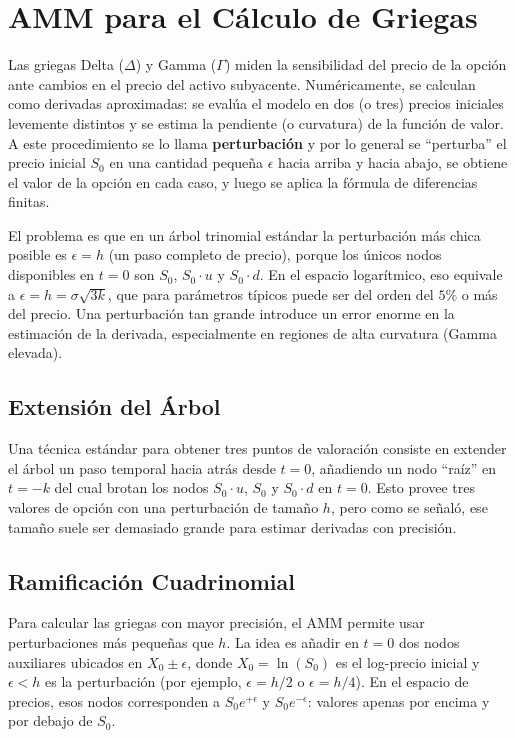 \section{AMM para el Cálculo de Griegas}
\label{sec:amm_greek}

Las griegas Delta ($\Delta$) y Gamma ($\Gamma$) miden la sensibilidad del precio de la opción ante cambios en el precio del activo subyacente. Numéricamente, se calculan como derivadas aproximadas: se evalúa el modelo en dos (o tres) precios iniciales levemente distintos y se estima la pendiente (o curvatura) de la función de valor. A este procedimiento se lo llama \textbf{perturbación} y por lo general se ``perturba'' el precio inicial $S_0$ en una cantidad pequeña $\epsilon$ hacia arriba y hacia abajo, se obtiene el valor de la opción en cada caso, y luego se aplica la fórmula de diferencias finitas.

El problema es que en un árbol trinomial estándar la perturbación más chica posible es $\epsilon = h$ (un paso completo de precio), porque los únicos nodos disponibles en $t=0$ son $S_0$, $S_0 \cdot u$ y $S_0 \cdot d$. En el espacio logarítmico, eso equivale a $\epsilon = h = \sigma\sqrt{3k}$, que para parámetros típicos puede ser del orden del $5\%$ o más del precio. Una perturbación tan grande introduce un error enorme en la estimación de la derivada, especialmente en regiones de alta curvatura (Gamma elevada).

\subsection{Extensión del Árbol}

Una técnica estándar para obtener tres puntos de valoración consiste en extender el árbol un paso temporal hacia atrás desde $t=0$, añadiendo un nodo ``raíz'' en $t=-k$ del cual brotan los nodos $S_0 \cdot u$, $S_0$ y $S_0 \cdot d$ en $t=0$. Esto provee tres valores de opción con una perturbación de tamaño $h$, pero como se señaló, ese tamaño suele ser demasiado grande para estimar derivadas con precisión.

\subsection{Ramificación Cuadrinomial}

Para calcular las griegas con mayor precisión, el AMM permite usar perturbaciones más pequeñas que $h$. La idea es añadir en $t=0$ dos nodos auxiliares ubicados en $X_0 \pm \epsilon$, donde $X_0 = \ln(S_0)$ es el log-precio inicial y $\epsilon < h$ es la perturbación (por ejemplo, $\epsilon = h/2$ o $\epsilon = h/4$). En el espacio de precios, esos nodos corresponden a $S_0 e^{+\epsilon}$ y $S_0 e^{-\epsilon}$: valores apenas por encima y por debajo de $S_0$.

